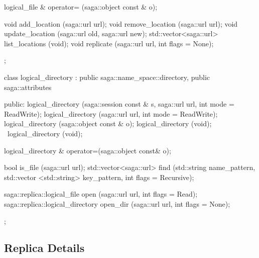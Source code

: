 \begin{mycode}[label=Prototypes: saga::replica]
{{{            logical_file & operator= (saga::object const & o);

            void  add_location    (saga::url url);
            void  remove_location (saga::url url);
            void  update_location (saga::url old,
                                   saga::url new);
            std::vector<saga::url>
                  list_locations  (void);
            void  replicate       (saga::url url,
                                   int       flags = None);
      };

      class logical_directory
          : public saga::name_space::directory,
            public saga::attributes
      {
      public:
        logical_directory  (saga::session const & s,
                            saga::url             url,
                            int                   mode = ReadWrite);
        logical_directory  (saga::url             url,
                            int                   mode = ReadWrite);
        logical_directory  (saga::object const  & o);
        logical_directory  (void);
       ~logical_directory  (void);

        logical_directory & operator=(saga::object const& o);

        bool  is_file      (saga::url url);
        std::vector<saga::url>
              find         (std::string               name_pattern,
                            std::vector <std::string> key_pattern,
                            int                       flags = Recursive);

        saga::replica::logical_file
              open         (saga::url                 url,
                            int                       flags = Read);
        saga::replica::logical_directory
              open_dir     (saga::url                 url,
                            int                       flags = None);
      };
    }
  }
 \end{mycode}

 \subsection{Replica Details}

